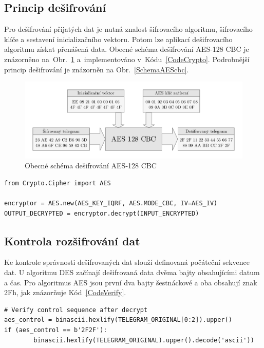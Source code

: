 \subsection{Princip dešifrování}
Pro dešifrování přijatých dat je nutná znalost šifrovacího algoritmu, šifrovacího klíče a sestavení inicializačního vektoru. Potom lze aplikací dešifrovacího algoritmu získat přenášená data. Obecné schéma dešifrování AES-128 CBC je znázorněno na~Obr.~\ref{SchemaAESobecne} a~implementováno v~Kódu~\ref{CodeCrypto}. Podrobnější princip dešifrování je znázorněn na Obr.~\ref{SchemaAEScbc}.

\begin{figure}[!ht]
\vspace{-10pt}
 \begin{center}
    \includegraphics[scale=0.8]{obrazky/wmbus_aes_schema}
  \end{center}
	\vspace{-30pt}
  \caption{Obecné schéma dešifrování AES-128 CBC}
	\label{SchemaAESobecne}
	\vspace{-20pt}
\end{figure}

\newpage{}

\begin{lstlisting}[caption={Implementace AES},captionpos=b,label=CodeCrypto,style=MyCodePython]
from Crypto.Cipher import AES

encryptor = AES.new(AES_KEY_IQRF, AES.MODE_CBC, IV=AES_IV)
OUTPUT_DECRYPTED = encryptor.decrypt(INPUT_ENCRYPTED)
\end{lstlisting}

\subsection{Kontrola rozšifrování dat}
Ke kontrole správnosti dešifrovaných dat slouží definovaná počáteční sekvence dat. U algoritmu DES začínají dešifrovaná data dvěma bajty obsahujícími datum a čas. Pro algoritmus AES jsou první dva bajty šestnáckové a oba obsahují znak 2Fh, jak znázorňuje Kód~\ref{CodeVerify}.

\begin{lstlisting}[caption={Ověření kontrolní sekvence AES},captionpos=b,label=CodeVerify,style=MyCodePython]
# Verify control sequence after decrypt
aes_control = binascii.hexlify(TELEGRAM_ORIGINAL[0:2]).upper()
if (aes_control == b'2F2F'):
		binascii.hexlify(TELEGRAM_ORIGINAL).upper().decode('ascii'))
\end{lstlisting}

